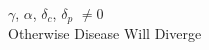\documentclass[preview]{standalone}
\begin{document}
\begin{center}
$\gamma$, $\alpha$, $\delta_c$, $\delta_p$ $\not= 0$\\Otherwise Disease Will Diverge
\end{center}
\end{document}
